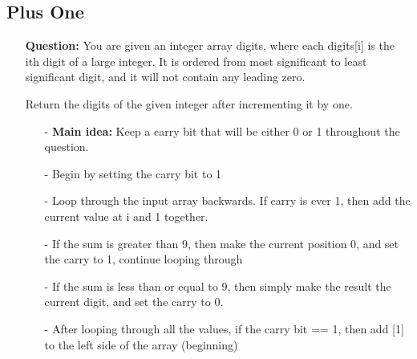 \documentclass[12pt]{article}
\begin{document}
\subsection{Plus One}
\begin{enumerate}
  \item[] \textbf{Question:} You are given an integer array digits, where each digits[i] is the ith digit of a large integer. It is ordered from most significant to least significant digit, and it will not contain any leading zero.

Return the digits of the given integer after incrementing it by one.
  

    \begin{enumerate}
      \item[-] \textbf{Main idea:} Keep a carry bit that will be either 0 or 1 throughout the question. 
      \item[-] Begin by setting the carry bit to 1
      \item[-] Loop through the input array backwards. If carry is ever 1, then add the current value at i and 1 together. 
      \item[-] If the sum is greater than 9, then make the current position 0, and set the carry to 1, continue looping through
      \item[-] If the sum is less than or equal to 9, then simply make the result the current digit, and set the carry to 0.
      \item[-] After looping through all the values, if the carry bit == 1, then add [1] to the left side of the array (beginning)

    \end{enumerate}
\end{enumerate}
\end{document}
